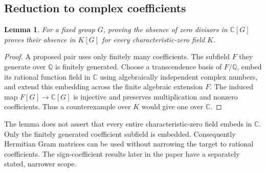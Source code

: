 \documentclass[11pt,a4paper,oneside]{report}
\newtheorem{lemma}[theorem]{Lemma}
\theoremstyle{definition}
\theoremstyle{remark}
\newcommand{\C}{\mathbb C}
\newcommand{\Q}{\mathbb Q}
\begin{document}
\subsection{Reduction to complex coefficients}
\begin{lemma}\label{M02:lem:complex}
For a fixed group \(G\), proving the absence of zero divisors in \(\C[G]\) proves their absence in \(K[G]\) for every characteristic-zero field \(K\).
\end{lemma}
\begin{proof}
A proposed pair uses only finitely many coefficients. The subfield \(F\) they generate over \(\Q\) is finitely generated. Choose a transcendence basis of \(F/\Q\), embed its rational function field in \(\C\) using algebraically independent complex numbers, and extend this embedding across the finite algebraic extension \(F\). The induced map \(F[G]\to\C[G]\) is injective and preserves multiplication and nonzero coefficients. Thus a counterexample over \(K\) would give one over \(\C\).
\end{proof}
The lemma does not assert that every entire characteristic-zero field embeds in \(\C\). Only the finitely generated coefficient subfield is embedded. Consequently Hermitian Gram matrices can be used without narrowing the target to rational coefficients. The sign-coefficient results later in the paper have a separately stated, narrower scope.
\end{document}
